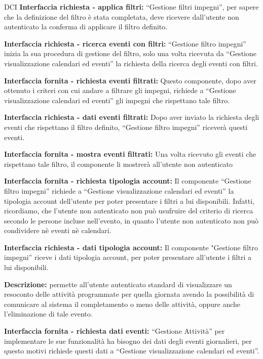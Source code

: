 \begin{listaPersonale}{DCI}
    \textbf{Interfaccia richiesta - applica filtri:} “Gestione filtri impegni”, per sapere che la definizione del filtro è stata completata, deve ricevere dall'utente non autenticato la conferma di applicare il filtro definito.

    \textbf{Interfaccia richiesta - ricerca eventi con filtri:} “Gestione filtro impegni” inizia la sua procedura di gestione del filtro, solo una volta ricevuta da “Gestione visualizzazione calendari ed eventi” la richiesta della ricerca degli eventi con filtri.

    \textbf{Interfaccia fornita - richiesta eventi filtrati:} Questo componente, dopo aver ottenuto i criteri con cui andare a filtrare gli impegni, richiede a “Gestione visualizzazione calendari ed eventi” gli impegni che rispettano tale filtro.

    \textbf{Interfaccia richiesta - dati eventi filtrati:} Dopo aver inviato la richiesta degli eventi che rispettano il filtro definito, “Gestione filtro impegni” riceverà questi eventi.

    \textbf{Interfaccia fornita - mostra eventi filtrati:} Una volta ricevuto gli eventi che rispettano tale filtro, il componente li mostrerà all'utente non autenticato

    \textbf{Interfaccia fornita - richiesta tipologia account:} Il componente “Gestione filtro impegni” richiede a “Gestione visualizzazione calendari ed eventi”  la tipologia account dell'utente per poter presentare i filtri a lui disponibili. Infatti, ricordiamo, che l'utente non autenticato non può usufruire del criterio di ricerca secondo le persone incluse nell'evento, in quanto l'utente non autenticato non può condividere nè eventi nè calendari.

    \textbf{Interfaccia richiesta - dati tipologia account:} Il componente "Gestione filtro impegni” riceve i dati tipologia account, per poter presentare all'utente i filtri a lui disponibili.



    \textbf{Descrizione:} permette all'utente autenticato standard di visualizzare un resoconto delle attività programmate per quella giornata avendo la possibilità di comunicare al sistema il completamento o meno delle attività, oppure anche l'eliminazione di tale evento.

    \textbf{Interfaccia fornita - richiesta dati eventi:} “Gestione Attività” per implementare le sue funzionalità ha bisogno dei dati degli eventi giornalieri, per questo motivi richiede questi dati a “Gestione visualizzazione calendari ed eventi”.


\end{listaPersonale}
